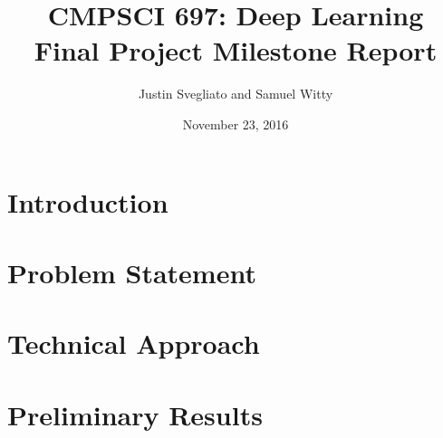 \documentclass{article}
\begin{document}
\title{CMPSCI 697: Deep Learning\\Final Project Milestone Report}
\author{Justin Svegliato and Samuel Witty}
\date{November 23, 2016}

\maketitle

\section{Introduction}

\section{Problem Statement}

\section{Technical Approach}

\section{Preliminary Results}
\end{document}
